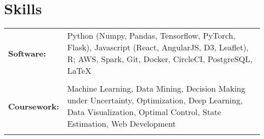 \documentclass[a4paper,10pt]{article}
\begin{document}

\section{Skills}
\begin{tabularx}{\textwidth}{lX}
\bf{Software:}& Python (Numpy, Pandas, Tensorflow, PyTorch, Flask), Javascript (React, AngularJS, D3, Leaflet), R; AWS, Spark, Git, Docker, CircleCI, PostgreSQL, \LaTeX \\ \\ 

 \bf{Coursework:}& Machine Learning, Data Mining, Decision Making under Uncertainty, Optimization, Deep Learning, Data Visualization, Optimal Control, State Estimation, Web Development\\ \\ 


\end{tabularx}

\nocite{*}


\end{document}
